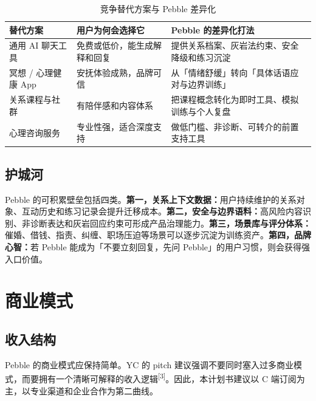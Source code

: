 \documentclass[UTF8,11pt,a4paper]{ctexart}
\newcommand{\refnum}[1]{\textsuperscript{\textcolor{PebbleAccent}{[#1]}}}
\newcommand{\thbg}[1]{\textcolor{PebbleInk}{\textbf{#1}}}
\begin{document}
\begin{table}[htbp]
\small
\caption{竞争替代方案与 Pebble 差异化}
\centering
\begin{tabularx}{\textwidth}{p{3.2cm}YY}
\toprule
{}\thbg{替代方案} & \thbg{用户为何会选择它} & \thbg{Pebble 的差异化打法} \\
\midrule
通用 AI 聊天工具 & 免费或低价，能生成解释和回复 & 提供关系档案、灰岩法约束、安全降级和练习沉淀 \\
冥想 / 心理健康 App & 安抚体验成熟，品牌可信 & 从「情绪舒缓」转向「具体话语应对与边界训练」 \\
关系课程与社群 & 有陪伴感和内容体系 & 把课程概念转化为即时工具、模拟训练与个人复盘 \\
心理咨询服务 & 专业性强，适合深度支持 & 做低门槛、非诊断、可转介的前置支持工具 \\
\bottomrule
\end{tabularx}
\end{table}

\subsection{护城河}

Pebble 的可积累壁垒包括四类。\textbf{第一，关系上下文数据：}用户持续维护的关系对象、互动历史和练习记录会提升迁移成本。\textbf{第二，安全与边界语料：}高风险内容识别、非诊断表达和灰岩回应约束可形成产品治理能力。\textbf{第三，场景库与评分体系：}催婚、借钱、指责、纠缠、职场压迫等场景可以逐步沉淀为训练资产。\textbf{第四，品牌心智：}若 Pebble 能成为「不要立刻回复，先问 Pebble」的用户习惯，则会获得强入口价值。

\section{商业模式}

\subsection{收入结构}

Pebble 的商业模式应保持简单。YC 的 pitch 建议强调不要同时塞入过多商业模式，而要拥有一个清晰可解释的收入逻辑\refnum{3}。因此，本计划书建议以 C 端订阅为主，以专业渠道和企业合作为第二曲线。
\end{document}
